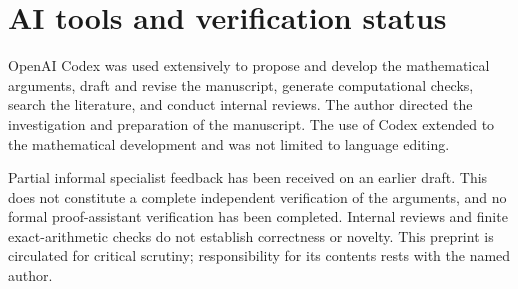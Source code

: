 \documentclass[11pt]{article}
\theoremstyle{definition}\newtheorem{definition}[theorem]{Definition}
\theoremstyle{remark}\newtheorem{remark}[theorem]{Remark}
\begin{document}
\section{AI tools and verification status}
OpenAI Codex was used extensively to propose and develop the mathematical arguments, draft and revise the manuscript, generate computational checks, search the literature, and conduct internal reviews. The author directed the investigation and preparation of the manuscript. The use of Codex extended to the mathematical development and was not limited to language editing.

Partial informal specialist feedback has been received on an earlier draft. This does not constitute a complete independent verification of the arguments, and no formal proof-assistant verification has been completed. Internal reviews and finite exact-arithmetic checks do not establish correctness or novelty. This preprint is circulated for critical scrutiny; responsibility for its contents rests with the named author.
\end{document}
